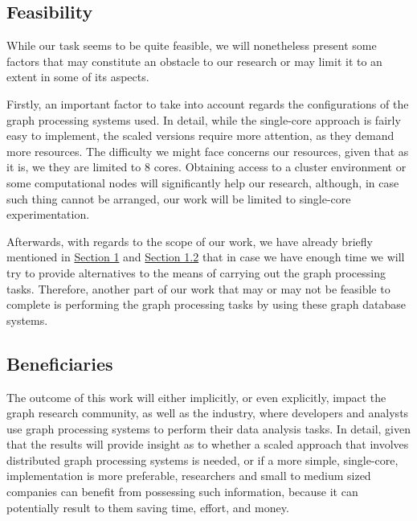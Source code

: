 \documentclass[a4paper,11pt]{article}
\begin{document}
\subsection{Feasibility} \label{feasibility}

\par While our task seems to be quite feasible, we will nonetheless present some factors that may constitute an obstacle to our research or may limit it to an extent in some of its aspects.

\medskip

\par Firstly, an important factor to take into account regards the configurations of the graph processing systems used. In detail, while the single-core approach is fairly easy to implement, the scaled versions require more attention, as they demand more resources. The difficulty we might face concerns our resources, given that as it is, we they are limited to 8 cores. Obtaining access to a cluster environment or some computational nodes will significantly help our research, although, in case such thing cannot be arranged, our work will be limited to single-core experimentation.

\medskip

\par Afterwards, with regards to the scope of our work, we have already briefly mentioned in \hyperref[introduction]{Section 1} and \hyperref[hypothesis]{Section 1.2} that in case we have enough time we will try to provide alternatives to the means of carrying out the graph processing tasks. Therefore, another part of our work that may or may not be feasible to complete is performing the graph processing tasks by using these graph database systems.


\subsection{Beneficiaries}

\par The outcome of this work will either implicitly, or even explicitly, impact the graph research community, as well as the industry, where developers and analysts use graph processing systems to perform their data analysis tasks. In detail, given that the results will provide insight as to whether a scaled approach that involves distributed graph processing systems is needed, or if a more simple, single-core, implementation is more preferable, researchers and small to medium sized companies can benefit from possessing such information, because it can potentially result to them saving time, effort, and money. 
\end{document}
